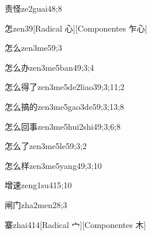 \begin{verbete}{责怪}{ze2guai4}{8;8}
\end{verbete}

\begin{verbete}{怎}{zen3}{9}[Radical 心][Componentes 乍心]
\end{verbete}

\begin{verbete}{怎么}{zen3me5}{9;3}
\end{verbete}

\begin{verbete}{怎么办}{zen3me5ban4}{9;3;4}
\end{verbete}

\begin{verbete}{怎么得了}{zen3me5de2liao3}{9;3;11;2}
\end{verbete}

\begin{verbete}{怎么搞的}{zen3me5gao3de5}{9;3;13;8}
\end{verbete}

\begin{verbete}{怎么回事}{zen3me5hui2shi4}{9;3;6;8}
\end{verbete}

\begin{verbete}{怎么了}{zen3me5le5}{9;3;2}
\end{verbete}

\begin{verbete}{怎么样}{zen3me5yang4}{9;3;10}
\end{verbete}

\begin{verbete}{增速}{zeng1su4}{15;10}
\end{verbete}

\begin{verbete}{闸门}{zha2men2}{8;3}
\end{verbete}

\begin{verbete}{寨}{zhai4}{14}[Radical 宀][Componentes 木]
\end{verbete}

